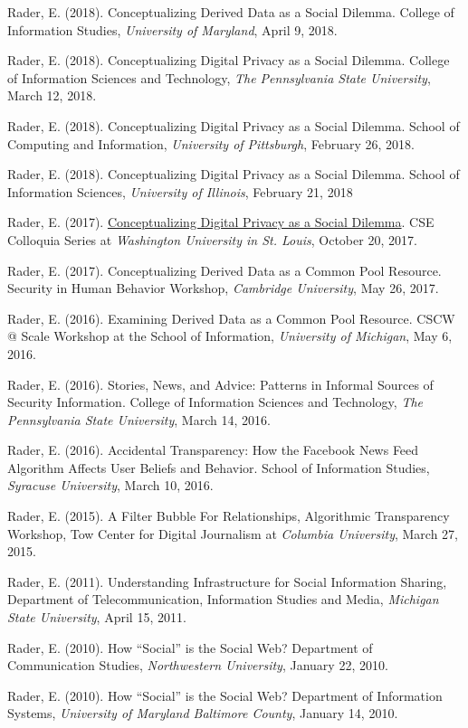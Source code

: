 \documentclass[9pt]{extarticle}
\begin{document}
Rader, E. (2018). Conceptualizing Derived Data as a Social Dilemma. College of Information Studies, \emph{University of Maryland}, April 9, 2018.

Rader, E. (2018). Conceptualizing Digital Privacy as a Social Dilemma. College of Information Sciences and Technology, \emph{The Pennsylvania State University}, March 12, 2018.

Rader, E. (2018). Conceptualizing Digital Privacy as a Social Dilemma. School of Computing and Information, \emph{University of Pittsburgh}, February 26, 2018.

Rader, E. (2018). Conceptualizing Digital Privacy as a Social Dilemma. School of Information Sciences, \emph{University of Illinois}, February 21, 2018

Rader, E. (2017). \href{https://engineering.wustl.edu/Events/Pages/CSE-Colloquia-Series-Emilee-Rader.aspx}{Conceptualizing Digital Privacy as a Social Dilemma}. CSE Colloquia Series at \emph{Washington University in St. Louis}, October 20, 2017.

Rader, E. (2017). Conceptualizing Derived Data as a Common Pool Resource. Security in Human Behavior Workshop, \emph{Cambridge University}, May 26, 2017.

Rader, E. (2016). Examining Derived Data as a Common Pool Resource. CSCW @ Scale Workshop at the School of Information, \emph{University of Michigan}, May 6, 2016.

Rader, E. (2016). Stories, News, and Advice: Patterns in Informal Sources of Security Information. College of Information Sciences and Technology, \emph{The Pennsylvania State University}, March 14, 2016.

Rader, E. (2016). Accidental Transparency: How the Facebook News Feed Algorithm Affects User Beliefs and Behavior. School of Information Studies, \emph{Syracuse University}, March 10, 2016.

Rader, E. (2015). A Filter Bubble For Relationships, Algorithmic Transparency Workshop, Tow Center for Digital Journalism at \emph{Columbia University}, March 27, 2015.

Rader, E. (2011). Understanding Infrastructure for Social Information Sharing, Department of Telecommunication, Information Studies and Media, \emph{Michigan State University}, April 15, 2011.

Rader, E. (2010). How ``Social'' is the Social Web? Department of Communication Studies, \emph{Northwestern University}, January 22, 2010.

Rader, E. (2010). How ``Social'' is the Social Web? Department of Information Systems, \emph{University of Maryland Baltimore County}, January 14, 2010.
\end{document}
